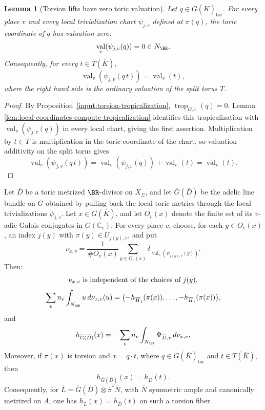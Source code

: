 \documentclass[10pt,a4paper]{amsart}
\theoremstyle{plain}
\newtheorem{lemma}[theorem]{Lemma}
\DeclareMathOperator{\val}{val}
\theoremstyle{plain}
\numberwithin{equation}{section}
\providecommand{\bD}{\overline{D}}
\providecommand{\bL}{\overline{L}}
\providecommand{\bN}{\overline{N}}
\begin{document}
\begin{lemma}[Torsion lifts have zero toric valuation]
	\label{lem:torsion-lift-zero-valuation}
	Let \(q\in G(\overline K)_{\operatorname{tor}}\).  For every place \(v\) and
	every local trivialization chart \(\psi_{j,v}\) defined at \(\pi(q)\), the
	toric coordinate of \(q\) has valuation zero:
	\[
	\val_v(\psi_{j,v}(q))=0\in N_{\BR}.
	\]
	Consequently, for every \(t\in T(\overline K)\),
	\[
	\val_v(\psi_{j,v}(q\,t))=\val_v(t),
	\]
	where the right hand side is the ordinary valuation of the split torus \(T\).
\end{lemma}

\begin{proof}
	By Proposition~\ref{input:torsion-tropicalization},
	\(\operatorname{trop}_{G,v}(q)=0\).  Lemma
	\ref{lem:local-coordinates-compute-tropicalization} identifies this
	tropicalization with \(\val_v(\psi_{j,v}(q))\) in every local chart, giving the
	first assertion.  Multiplication by \(t\in T\) is
	multiplication in the toric coordinate of the chart, so valuation additivity on
	the split torus gives
	\[
	\val_v(\psi_{j,v}(q\,t))
	=\val_v(\psi_{j,v}(q))+\val_v(t)
	=\val_v(t).
	\]
\end{proof}

\begin{prop}\label{prop:section4-valuation-height-package}
	Let \(\bD\) be a toric metrized \(\BR\)-divisor on \(X_\Sigma\), and let
	\(\overline G(\bD)\) be the adelic line bundle on \(\overline G\) obtained by
	pulling back the local toric metrics through the local trivializations
	\(\psi_{j,v}\).  Let \(x\in G(\overline K)\), and let \(O_v(x)\) denote the
	finite set of its \(v\)-adic Galois conjugates in \(G(\mathbb C_v)\).  For every
	place \(v\), choose, for each \(y\in O_v(x)\), an index \(j(y)\) with
	\(\pi(y)\in U_{j(y),v}\), and put
	\[
	\nu_{x,v}
	=
	\frac1{\#O_v(x)}
	\sum_{y\in O_v(x)}
	\delta_{\val_v(\psi_{j(y),v}(y))}.
	\]
	Then:
	\[
	\nu_{x,v}\ \hbox{is independent of the choices of }j(y),
	\]
	\[
	\sum_v n_v\int_{N_\BR}u\,d\nu_{x,v}(u)
	=
	\bigl(-h_{\overline H_1}(\pi(x)),\ldots,
	-h_{\overline H_t}(\pi(x))\bigr),
	\]
	and
	\[
	h_{\overline G(\bD)}(x)
	=
	-\sum_v n_v\int_{N_\BR}\Psi_{\bD,v}\,d\nu_{x,v}.
	\]
	Moreover, if \(\pi(x)\) is torsion and \(x=q\cdot t\), where
	\(q\in G(\overline K)_{\operatorname{tor}}\) and \(t\in T(\overline K)\), then
	\[
	h_{\overline G(\bD)}(x)=h_{\bD}(t).
	\]
	Consequently, for
	\(\bL=\overline G(\bD)\otimes\overline\pi^*\bN\), with \(\bN\) symmetric ample
	and canonically metrized on \(A\), one has \(h_{\bL}(x)=h_{\bD}(t)\) on such a
	torsion fiber.
\end{prop}
\end{document}
